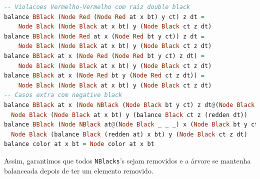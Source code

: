 \begin{lstlisting}[language=haskell]
-- Violacoes Vermelho-Vermelho com raiz double black
balance BBlack (Node Red (Node Red at x bt) y ct) z dt = 
	Node Black (Node Black at x bt) y (Node Black ct z dt)
balance BBlack (Node Red at x (Node Red bt y ct)) z dt = 
	Node Black (Node Black at x bt) y (Node Black ct z dt)
balance BBlack at x (Node Red (Node Red bt y ct) z dt) = 
	Node Black (Node Black at x bt) y (Node Black ct z dt)
balance BBlack at x (Node Red bt y (Node Red ct z dt)) = 
	Node Black (Node Black at x bt) y (Node Black ct z dt)
-- Casos extra com negative black
balance BBlack at x (Node NBlack (Node Black bt y ct) z dt@(Node Black _ _ _)) =
  Node Black (Node Black at x bt) y (balance Black ct z (redden dt))
balance BBlack (Node NBlack at@(Node Black _ _ _) x (Node Black bt y ct)) z dt =
  Node Black (balance Black (redden at) x bt) y (Node Black ct z dt)
balance color at x bt = Node color at x bt
\end{lstlisting}

Assim, garantimos que todos \texttt{NBlacks}'s sejam removidos e a árvore se mantenha balanceada depois de ter um elemento removido.
